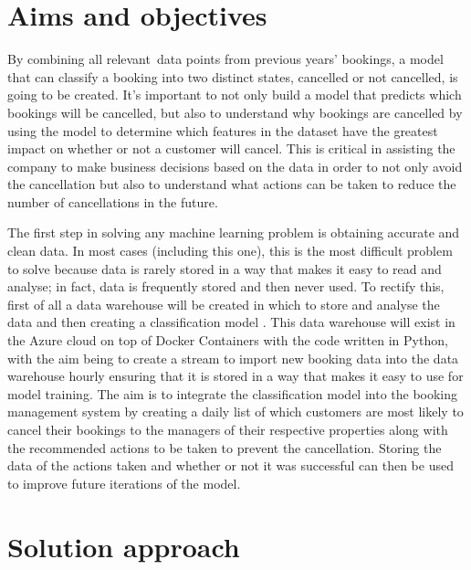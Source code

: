 \section{Aims and objectives}

By combining all relevant data points from previous years' bookings, a model that can classify a booking into two distinct states, cancelled or not cancelled, is going to be created. It's important to not only build a model that predicts which bookings will be cancelled, but also to understand why bookings are cancelled by using the model to determine which features in the dataset have the greatest impact on whether or not a customer will cancel. This is critical in assisting the company to make business decisions based on the data in order to not only avoid the cancellation but also to understand what actions can be taken to reduce the number of cancellations in the future.

\vspace{5mm}

The first step in solving any machine learning problem is obtaining accurate and clean data. In most cases (including this one), this is the most difficult problem to solve because data is rarely stored in a way that makes it easy to read and analyse; in fact, data is frequently stored and then never used. To rectify this, first of all a data warehouse will be created in which to store and analyse the data and then creating a classification model \cite{SessionsTHEALGORITHMS}. This data warehouse will exist in the Azure cloud on top of Docker Containers with the code written in Python, with the aim being to create a stream to import new booking data into the data warehouse hourly ensuring that it is stored in a way that makes it easy to use for model training. The aim is to integrate the classification model into the booking management system by creating a daily list of which customers are most likely to cancel their bookings to the managers of their respective properties along with the recommended actions to be taken to prevent the cancellation. Storing the data of the actions taken and whether or not it was successful can then be used to improve future iterations of the model.

\section{Solution approach}

